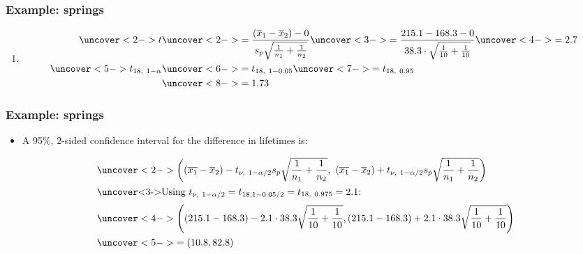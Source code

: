\documentclass[handout]{beamer}\usepackage[]{graphicx}\usepackage[]{color}
\providecommand{\ov}[1]{\overline{#1}}
\numberwithin{equation}{section}
\begin{document}
\begin{frame}
\frametitle{Example: springs}
\begin{enumerate}[1. ]
 \setcounter{enumi}{\value{saveenum}}
\item 
\begin{align*}
\uncover<2->{t} & \uncover<2->{=  \frac{(\ov{x}_1 - \ov{x}_2) - 0}{s_p \sqrt{\frac{1}{n_1} + \frac{1}{n_2}}}} \uncover<3->{ = \frac{215.1 - 168.3 - 0}{38.3 \cdot \sqrt{\frac{1}{10} + \frac{1}{10}}}} \uncover<4->{= 2.7} \\
\uncover<5->{t_{18, \ 1 - \alpha}} & \uncover<6->{= t_{18, \ 1 - 0.05}}  \uncover<7->{= t_{18, \ 0.95}}  \\
&\uncover<8->{= 1.73}
\end{align*}
\end{enumerate}
\end{frame}


\begin{frame}
\frametitle{Example: springs} \scriptsize
\begin{itemize}
\item A 95\%, 2-sided confidence interval for the difference in lifetimes is:
\end{itemize}
\begin{align*}
&\uncover<2->{\left ((\ov{x_1} - \ov{x}_2) - t_{\nu, \ 1 - \alpha/2} s_p \sqrt{\frac{1}{n_1} + \frac{1}{n_2}} , \ (\ov{x_1} - \ov{x}_2) + t_{\nu, \ 1 - \alpha/2} s_p \sqrt{\frac{1}{n_1} + \frac{1}{n_2}} \right )} \\
\intertext{\uncover<3->{Using $t_{\nu, \ 1 - \alpha/2} = t_{18, 1 - 0.05/2} = t_{18, \ 0.975} = 2.1$:}}
&\uncover<4->{\left ((215.1 - 168.3) - 2.1 \cdot 38.3 \sqrt{\frac{1}{10} + \frac{1}{10}} , (215.1 - 168.3) + 2.1 \cdot 38.3 \sqrt{\frac{1}{10} + \frac{1}{10}} \right )} \\
&\uncover<5->{=  (10.8, 82.8)}
\end{align*}
\begin{itemize}
\end{itemize}
\end{frame}
\end{document}
